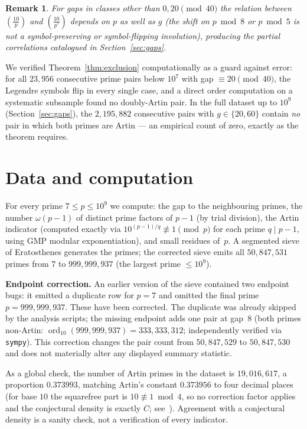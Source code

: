 \documentclass[11pt]{amsart}
\newtheorem{remark}{Remark}
\theoremstyle{definition}
\newcommand{\Lsym}[2]{\left(\tfrac{#1}{#2}\right)}
\begin{document}
\begin{remark}
	For gaps in classes other than $0, 20 \pmod{40}$ the relation between
	$\Lsym{10}{p}$ and $\Lsym{10}{p'}$ depends on $p$ as well as $g$ (the shift on
	$p \bmod 8$ or $p \bmod 5$ is not a symbol-preserving or symbol-flipping
	involution), producing the partial correlations catalogued in
	Section~\ref{sec:gaps}.
\end{remark}

We verified Theorem~\ref{thm:exclusion} computationally as a guard against
error: for all $23{,}956$ consecutive prime pairs below $10^7$ with gap
$\equiv 20 \pmod{40}$, the Legendre symbols flip in every single case, and a
direct order computation on a systematic subsample found no doubly-Artin pair.
In the full dataset up to $10^9$ (Section~\ref{sec:gaps}), the
$2{,}195{,}882$ consecutive pairs with $g \in \{20, 60\}$ contain \emph{no}
pair in which both primes are Artin --- an empirical count of zero, exactly as
the theorem requires.

\section{Data and computation}
\label{sec:data}

For every prime $7 \le p \le 10^9$ we compute: the gap to the neighbouring
primes, the number $\omega(p-1)$ of distinct prime factors of $p - 1$ (by
trial division), the Artin indicator (computed exactly via
$10^{(p-1)/q} \not\equiv 1 \pmod p$ for each prime $q \mid p - 1$, using GMP
modular exponentiation), and small residues of~$p$. A segmented sieve of
Eratosthenes generates the primes; the corrected sieve emits all
$50{,}847{,}531$ primes from $7$ to $999{,}999{,}937$ (the largest prime
$\le 10^9$).

\textbf{Endpoint correction.} An earlier version of the sieve contained two
endpoint bugs: it emitted a duplicate row for $p = 7$ and omitted the final
prime $p = 999{,}999{,}937$. These have been corrected. The duplicate was
already skipped by the analysis scripts; the missing endpoint adds one pair
at gap~$8$ (both primes non-Artin: $\operatorname{ord}_{10}(999{,}999{,}937) =
	333{,}333{,}312$; independently verified via \texttt{sympy}). This correction
changes the pair count from $50{,}847{,}529$ to $50{,}847{,}530$ and does not
materially alter any displayed summary statistic.

As a global check, the number of Artin primes in the dataset is
$19{,}016{,}617$, a proportion $0.373993$, matching Artin's constant
$0.373956$ to four decimal places (for base $10$ the squarefree part is
$10 \not\equiv 1 \bmod 4$, so no correction factor applies and the conjectural
density is exactly $C$; see~\cite{Hooley1967,Moree2012}). Agreement with a
conjectural density is a sanity check, not a verification of every indicator.
\end{document}
